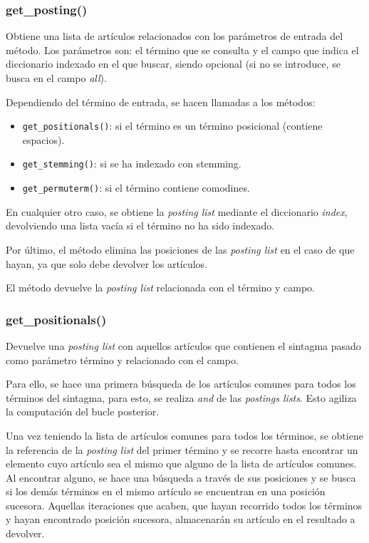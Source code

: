 \documentclass[12pt,a4paper]{article}
\begin{document}
\subsubsection{get\_posting()}
Obtiene una lista de artículos relacionados con los parámetros de entrada del método.
Los parámetros son: el término que se consulta y el campo que indica el diccionario indexado en el que buscar, siendo opcional (si no se introduce, se busca en el campo \textit{all}).

Dependiendo del término de entrada, se hacen llamadas a los métodos:
\begin{itemize}
    \item \texttt{get\_positionals()}: si el término es un término posicional (contiene espacios).
    \item \texttt{get\_stemming()}: si se ha indexado con stemming.
    \item \texttt{get\_permuterm()}: si el término contiene comodines.
\end{itemize}

En cualquier otro caso, se obtiene la \textit{posting list} mediante el diccionario \textit{index}, devolviendo una lista vacía si el término no ha sido indexado.

Por último, el método elimina las posiciones de las \textit{posting list} en el caso de que hayan, ya que solo debe devolver los artículos.

El método devuelve la \textit{posting list} relacionada con el término y campo.

\subsubsection{get\_positionals()}
Devuelve una \textit{posting list} con aquellos artículos que contienen el sintagma pasado como parámetro término y relacionado con el campo.

Para ello, se hace una primera búsqueda de los artículos comunes para todos los términos del sintagma, para esto, se realiza \textit{and} de las \textit{postings lists}. Esto agiliza la computación del bucle posterior.

Una vez teniendo la lista de artículos comunes para todos los términos, se obtiene la referencia de la \textit{posting list} del primer término y se recorre hasta encontrar un elemento cuyo artículo sea el mismo que alguno de la lista de artículos comunes. Al encontrar alguno, se hace una búsqueda a través de sus posiciones y se busca si los demás términos en el mismo artículo se encuentran en una posición sucesora. Aquellas iteraciones que acaben, que hayan recorrido todos los términos y hayan encontrado posición sucesora, almacenarán su artículo en el resultado a devolver.
\end{document}
